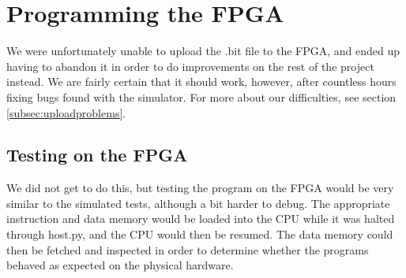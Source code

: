 \section{Programming the FPGA}
We were unfortunately unable to upload the .bit file to the FPGA, and ended up having to abandon it in order to do improvements on the rest of the project instead.
We are fairly certain that it should work, however, after countless hours fixing bugs found with the simulator.
For more about our difficulties, see section \ref{subsec:uploadproblems}.

\subsection{Testing on the FPGA}
We did not get to do this, but testing the program on the FPGA would be very similar to the simulated tests, although a bit harder to debug.
The appropriate instruction and data memory would be loaded into the CPU while it was halted through host.py, and the CPU would then be resumed.
The data memory could then be fetched and inspected in order to determine whether the programs behaved as expected on the physical hardware.
